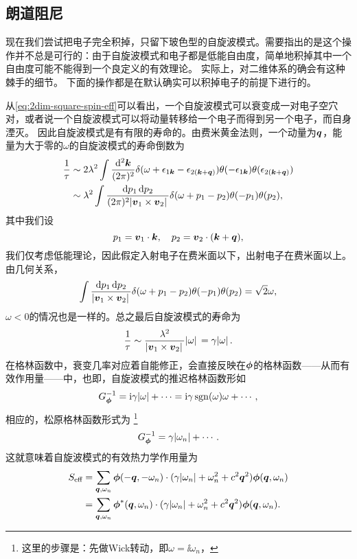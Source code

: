 \subsection{朗道阻尼}

现在我们尝试把电子完全积掉，只留下玻色型的自旋波模式。需要指出的是这个操作并不总是可行的：由于自旋波模式和电子都是低能自由度，简单地积掉其中一个自由度可能不能得到一个良定义的有效理论。
实际上，对二维体系的确会有这种棘手的细节。
下面的操作都是在默认确实可以积掉电子的前提下进行的。

从\eqref{eq:2dim-square-spin-eff}可以看出，一个自旋波模式可以衰变成一对电子空穴对，或者说一个自旋波模式可以将动量转移给一个电子而得到另一个电子，而自身湮灭。
因此自旋波模式是有有限的寿命的。由费米黄金法则，一个动量为$\vb*{q}$，能量为大于零的$\omega$的自旋波模式的寿命倒数为
\[
    \begin{aligned}
        \frac{1}{\tau} &\sim 2 \lambda^2 \int \frac{\dd[2]{\vb*{k}}}{(2\pi)^2} \delta(\omega + \epsilon_{1 \vb*{k}} - \epsilon_{2 (\vb*{k} + \vb*{q})}) \theta(- \epsilon_{1 \vb*{k}}) \theta(\epsilon_{2 (\vb*{k} + \vb*{q})}) \\
        &\sim \lambda^2 \int \frac{\dd{p_1} \dd{p_2}}{(2\pi)^2 \abs*{\vb*{v}_1 \times \vb*{v}_2}} \delta(\omega + p_1 - p_2) \theta(- p_1) \theta(p_2),
    \end{aligned}
\]
其中我们设
\[
    p_1 = \vb*{v}_1 \cdot \vb*{k}, \quad p_2 = \vb*{v}_2 \cdot (\vb*{k} + \vb*{q}),
\]
我们仅考虑低能理论，因此假定入射电子在费米面以下，出射电子在费米面以上。由几何关系，
\[
    \int \frac{\dd{p_1} \dd{p_2}}{\abs*{\vb*{v}_1 \times \vb*{v}_2}} \delta(\omega + p_1 - p_2) \theta(- p_1) \theta(p_2) = \sqrt{2} \omega,
\]
$\omega < 0$的情况也是一样的。总之最后自旋波模式的寿命为
\begin{equation}
    \frac{1}{\tau} \sim \frac{\lambda^2}{\abs*{\vb*{v}_1 \times \vb*{v}_2}} \abs*{\omega} = \gamma \abs*{\omega}.
\end{equation}
在格林函数中，衰变几率对应着自能修正，会直接反映在$\vb*{\phi}$的格林函数——从而有效作用量——中，也即，自旋波模式的推迟格林函数形如
\[
    G_{\vb*{\phi}}^{-1} = \mathrm{i} \gamma \abs{\omega} + \cdots = \mathrm{i}  \gamma \operatorname{sgn}(\omega) \omega + \cdots,
\]
相应的，松原格林函数形式为%
\footnote{这里的步骤是：先做Wick转动，即$\omega = \ii \omega_n$，}%
\[
    G_{\vb*{\phi}}^{-1} = \gamma \abs{\omega_n} + \cdots.
\]
这就意味着自旋波模式的有效热力学作用量为
\begin{equation}
    \begin{aligned}
        S_\text{eff} &= \sum_{\vb*{q}, \omega_n} \vb*{\phi}(-\vb*{q}, -\omega_n) \cdot (\gamma \abs{\omega_n} + \omega_n^2 + c^2 \vb*{q}^2 ) \vb*{\phi}(\vb*{q}, \omega_n) \\
        &= \sum_{\vb*{q}, \omega_n} \vb*{\phi}^*(\vb*{q}, \omega_n) \cdot (\gamma \abs{\omega_n} + \omega_n^2 + c^2 \vb*{q}^2) \vb*{\phi}(\vb*{q}, \omega_n).
    \end{aligned}
    \label{eq:effective-spin-action}
\end{equation}
